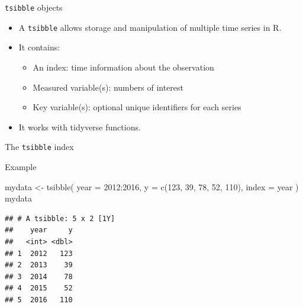 \documentclass[14pt,ignorenonframetext,aspectratio=169]{beamer}
\newenvironment{Shaded}{\begin{snugshade}}{\end{snugshade}}
\newcommand{\AttributeTok}[1]{\textcolor[rgb]{0.77,0.63,0.00}{#1}}
\newcommand{\DecValTok}[1]{\textcolor[rgb]{0.00,0.00,0.81}{#1}}
\newcommand{\FunctionTok}[1]{\textcolor[rgb]{0.00,0.00,0.00}{#1}}
\newcommand{\NormalTok}[1]{#1}
\newcommand{\OtherTok}[1]{\textcolor[rgb]{0.56,0.35,0.01}{#1}}
\newcommand{\SpecialCharTok}[1]{\textcolor[rgb]{0.00,0.00,0.00}{#1}}
\providecommand{\tightlist}{%
  \setlength{\itemsep}{0pt}\setlength{\parskip}{0pt}}
\renewenvironment{Shaded}{\color{black}\begin{snugshade}\color{black}}{\end{snugshade}}
\renewenvironment{Shaded}{\color{black}\fontsize{10}{10}\sf\begin{snugshade}\color{black}}{\end{snugshade}}
\begin{document}
\begin{frame}[fragile]{\texttt{tsibble} objects}
\protect\hypertarget{tsibble-objects-2}{}
\begin{itemize}
\item
  A \texttt{tsibble} allows storage and manipulation of multiple time
  series in R.
\item
  It contains:

  \begin{itemize}
  \tightlist
  \item
    An index: time information about the observation
  \item
    Measured variable(s): numbers of interest
  \item
    Key variable(s): optional unique identifiers for each series
  \end{itemize}
\item
  It works with tidyverse functions.
\end{itemize}
\end{frame}

\begin{frame}[fragile]{The \texttt{tsibble} index}
\protect\hypertarget{the-tsibble-index}{}
\begin{block}{Example}
\protect\hypertarget{example}{}
\fontsize{11}{12}\sf

\begin{Shaded}
\begin{Highlighting}[]
\NormalTok{mydata }\OtherTok{\textless{}{-}} \FunctionTok{tsibble}\NormalTok{(}
    \AttributeTok{year =} \DecValTok{2012}\SpecialCharTok{:}\DecValTok{2016}\NormalTok{,}
    \AttributeTok{y =} \FunctionTok{c}\NormalTok{(}\DecValTok{123}\NormalTok{, }\DecValTok{39}\NormalTok{, }\DecValTok{78}\NormalTok{, }\DecValTok{52}\NormalTok{, }\DecValTok{110}\NormalTok{),}
    \AttributeTok{index =}\NormalTok{ year}
\NormalTok{)}
\NormalTok{mydata}
\end{Highlighting}
\end{Shaded}

\begin{verbatim}
## # A tsibble: 5 x 2 [1Y]
##    year     y
##   <int> <dbl>
## 1  2012   123
## 2  2013    39
## 3  2014    78
## 4  2015    52
## 5  2016   110
\end{verbatim}
\end{block}
\end{frame}
\end{document}
